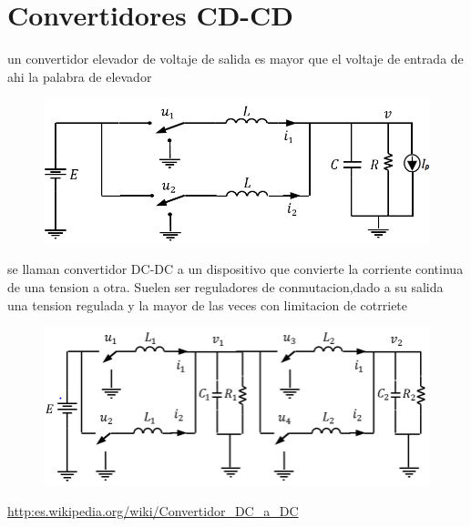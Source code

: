 \documentclass[11pt]{article}
\begin{document}
\section{Convertidores CD-CD}
un convertidor elevador de voltaje de salida es mayor que el voltaje de entrada de ahi la palabra de elevador 
\begin{figure}[htp]
\centering
\includegraphics[scale=0.50]{Figura-1-Convertidor-CD-CD-Reductor-Paralelo.png}
\caption{}
\label{}
\end{figure}




 se llaman convertidor DC-DC a un dispositivo que convierte la corriente continua de una tension a otra. Suelen ser reguladores de conmutacion,dado a su salida una tension regulada y la mayor de las veces con limitacion de cotrriete 
 
 

 

\begin{figure}[htp]
\centering
\includegraphics[scale=0.50]{Convertidor-cd-cd-reductor-paralelo-cascada.png}
\caption{}
\label{}
\end{figure}

\url{http:es.wikipedia.org/wiki/Convertidor_DC_a_DC}
\end{document}
